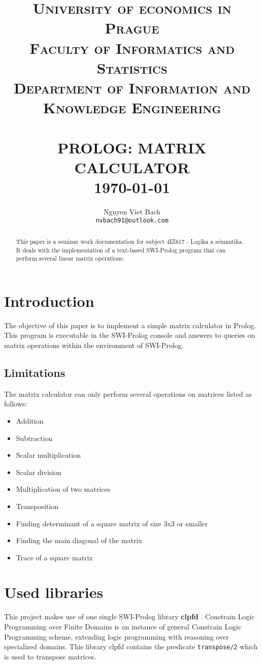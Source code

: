\documentclass[a4paper]{article}
\title{	\normalsize\textsc {
          University of economics in Prague\\	
          Faculty of Informatics and Statistics\\	
          Department of Information and Knowledge Engineering\\
        }
\textsc{} 	%
		 	\\[5.0cm]								%
			\LARGE \textbf{\uppercase{Prolog: Matrix Calculator}}	%
			\HRule{2pt} \\ [0.5cm]		%
			\normalsize \today			%
		}
\author{
		Nguyen Viet Bach\\	
        \texttt{nvbach91@outlook.com} \\
}
\makeatletter
\def\printtitle{%
    {\centering \@title\par}}
\def\printauthor{%
    {\centering \large \@author}}
\makeatother
\begin{document}
\thispagestyle{empty}		%

\printtitle					%
  	\vfill
\printauthor				%
\newpage
\begin{abstract}
This paper is a seminar work documentation for subject 4IZ617 - Logika a sémantika. It deals with the implementation of a text-based SWI-Prolog program that can perform several linear matrix operations.
\end{abstract}
\newpage

\section{Introduction}

The objective of this paper is to implement a simple matrix calculator in Prolog. This program is executable in the SWI-Prolog console and answers to queries on matrix operations within the environment of SWI-Prolog.

\subsection{Limitations}
The matrix calculator can only perform several operations on matrices listed as follows:
\begin{itemize}
\item Addition
\item Subtraction
\item Scalar multiplication
\item Scalar division
\item Multiplication of two matrices
\item Transposition
\item Finding determinant of a square matrix of size 3x3 or smaller
\item Finding the main diagonal of the matrix
\item Trace of a square matrix
\end{itemize}

\section{Used libraries}
This project makes use of one single SWI-Prolog library \textbf{clpfd} \cite{clpfd} . Constrain Logic Programming over Finite Domains is an instance of general Constrain Logic Programming scheme, extending logic programming with reasoning over specialized domains. This library clpfd contains the predicate \texttt{transpose/2} which is used to transpose matrices.
\end{document}
